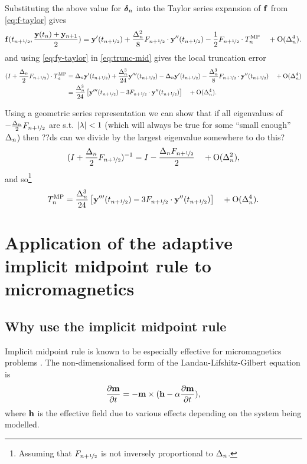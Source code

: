 Substituting the above value for $\dyn$ into the Taylor series expansion of $\fv$ from \eqref{eq:f-taylor} gives
\begin{equation}
  \fv(\thf, \frac{\yv(t_n) + \yv_{n+1}}{2}) = \yvhf[']
  + \frac{\dtn^2}{8} \dfdyhf \cdot \yvhf[''] - \frac{1}{2} \dfdyhf \cdot \lte^\IMP \porder{\dtn^4}
  . \label{eq:fy-taylor}
\end{equation}
and using \eqref{eq:fy-taylor} in \eqref{eq:trunc-mid} gives the local truncation error
\begin{align}
  (I + \frac{\dtn}{2}\dfdyhf) \cdot\lte^\IMP
  &= \dtn \yvhf['] + \frac{\dtn^3}{24} \yvhf[''']
  - \dtn \yvhf[']
  - \frac{\dtn^3}{8} \dfdyhf \cdot \yvhf[''] \porder{\dtn^4}
  \notag \\
  &= \frac{\dtn^3}{24} \left[\yvhf['''] - 3 \dfdyhf \cdot \yvhf[''] \right]
  \porder{\dtn^4}.
  \label{eq:trunc-implicit-form}
\end{align}

Using a geometric series representation we can show that if all eigenvalues of  $-\frac{\dtn}{2}\dfdyhf$ are s.t. $\abs{\lambda} < 1$\cite{??ds} (which will always be true for some ``small enough'' $\dtn$) then
??ds can we divide by the largest eigenvalue somewhere to do this?
\begin{equation}
  (I + \frac{\dtn}{2}\dfdyhf)^{-1} = I - \frac{\dtn \dfdyhf}{2}  \porder{\dtn^2},
\end{equation}
and so\footnote{Assuming that $\dfdyhf$ is not inversely proportional to $\dtn$.}
\begin{equation}
  \lte^\IMP = \frac{\dtn^3}{24} \left[\yvhf['''] - 3 \dfdyhf \cdot \yvhf[''] \right]
  \quad +\order{\dtn^4}.
  \label{eq:trunc-final}
\end{equation}



\section{Application of the adaptive implicit midpoint rule to micromagnetics}


\subsection{Why use the implicit midpoint rule}

Implicit midpoint rule is known to be especially effective for micromagnetics problems \cite{DAquino2005}.
The non-dimensionalised form of the Landau-Lifshitz-Gilbert equation is
\begin{equation}
  \label{eq:llg-prop-form}
  \dmdt = - \mv \times( \hv - \dampc \dmdt),
\end{equation}
where $\hv$ is the effective field due to various effects depending on the system being modelled.

